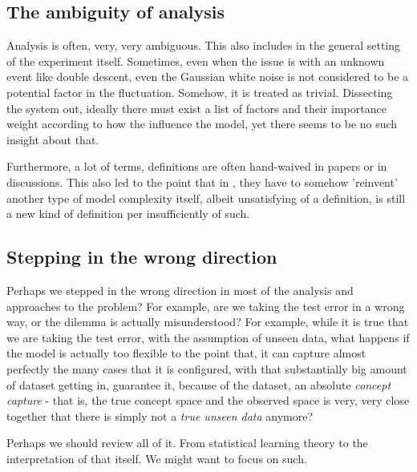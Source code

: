 \subsection{The ambiguity of analysis}
Analysis is often, very, very ambiguous. This also includes in the general setting of the experiment itself. Sometimes, even when the issue is with an unknown event like double descent, even the Gaussian white noise is not considered to be a potential factor in the fluctuation. Somehow, it is treated as trivial. Dissecting the system out, ideally there must exist a list of factors and their importance weight according to how the influence the model, yet there seems to be no such insight about that. 

Furthermore, a lot of terms, definitions are often hand-waived in papers or in discussions. This also led to the point that in \cite{nakkiran_deep_2019}, they have to somehow 'reinvent' another type of model complexity itself, albeit unsatisfying of a definition, is still a new kind of definition per insufficiently of such. 

\subsection{Stepping in the wrong direction}

Perhaps we stepped in the wrong direction in most of the analysis and approaches to the problem? For example, are we taking the test error in a wrong way, or the dilemma is actually misunderstood? For example, while it is true that we are taking the test error, with the assumption of unseen data, what happens if the model is actually too flexible to the point that, it can capture almost perfectly the many cases that it is configured, with that substantially big amount of dataset getting in, guarantee it, because of the dataset, an absolute \textit{concept capture} - that is, the true concept space and the observed space is very, very close together that there is simply not a \textit{true unseen data} anymore? 

Perhaps we should review all of it. From statistical learning theory to the interpretation of that itself. We might want to focus on such. 
